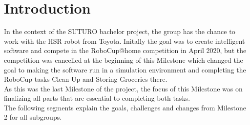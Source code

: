 \documentclass[main.tex]{subfiles}
\begin{document}
	
	\chapter{Introduction}

In the context of the SUTURO bachelor project, the group has the chance to work with the HSR robot from Toyota. Initally the goal was to create intelligent software and compete in the RoboCup@home competition in April 2020, but the competition was cancelled at the beginning of this Milestone which changed the goal to making the software run in a simulation environment and completing the RoboCup tasks Clean Up and Storing Groceries there.\\
As this was the last Milestone of the project, the focus of this Milestone was on finalizing all parts that are essential to completing both tasks.\\
The following segments explain the goals, challenges and changes from Milestone 2 for all subgroups.
	
\end{document}
